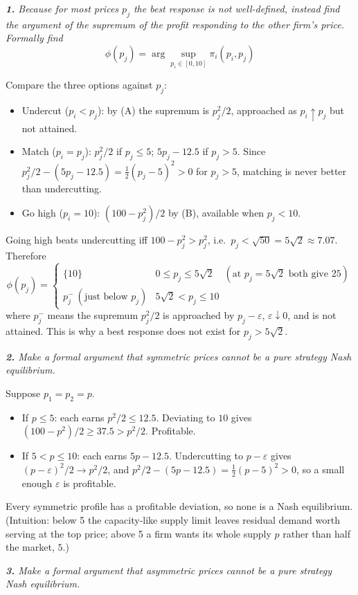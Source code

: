 \documentclass[11pt]{article}
\newcommand{\question}[1]{\par\smallskip\noindent\colorbox{black!6}{\parbox{\dimexpr\linewidth-2\fboxsep}{\itshape #1}}\par\smallskip}
\begin{document}
\question{\textbf{1.} Because for most prices $p_j$ the best response is not well-defined, instead find the argument of the supremum of the profit responding to the other firm's price. Formally find
\[
\phi(p_j)=\arg\sup_{p_i\in[0,10]}\pi_i(p_i,p_j)
\]}

Compare the three options against $p_j$:
\begin{itemize}
\item Undercut ($p_i<p_j$): by (A) the supremum is $p_j^2/2$, approached as $p_i\uparrow p_j$ but not attained.
\item Match ($p_i=p_j$): $p_j^2/2$ if $p_j\le5$; $5p_j-12.5$ if $p_j>5$. Since $p_j^2/2-(5p_j-12.5)=\tfrac12(p_j-5)^2>0$ for $p_j>5$, matching is never better than undercutting.
\item Go high ($p_i=10$): $(100-p_j^2)/2$ by (B), available when $p_j<10$.
\end{itemize}
Going high beats undercutting iff $100-p_j^2>p_j^2$, i.e.\ $p_j<\sqrt{50}=5\sqrt2\approx7.07$. Therefore
\[
\phi(p_j)=\begin{cases}
\{10\} & 0\le p_j\le5\sqrt2 \quad(\text{at } p_j=5\sqrt2 \text{ both give } 25)\\[2pt]
p_j^- \ (\text{just below } p_j) & 5\sqrt2<p_j\le10
\end{cases}
\]
where $p_j^-$ means the supremum $p_j^2/2$ is approached by $p_j-\varepsilon$, $\varepsilon\downarrow0$, and is not attained. This is why a best response does not exist for $p_j>5\sqrt2$.

\question{\textbf{2.} Make a formal argument that symmetric prices cannot be a pure strategy Nash equilibrium.}

Suppose $p_1=p_2=p$.
\begin{itemize}
\item If $p\le5$: each earns $p^2/2\le12.5$. Deviating to $10$ gives $(100-p^2)/2\ge37.5>p^2/2$. Profitable.
\item If $5<p\le10$: each earns $5p-12.5$. Undercutting to $p-\varepsilon$ gives $(p-\varepsilon)^2/2\to p^2/2$, and $p^2/2-(5p-12.5)=\tfrac12(p-5)^2>0$, so a small enough $\varepsilon$ is profitable.
\end{itemize}
Every symmetric profile has a profitable deviation, so none is a Nash equilibrium. (Intuition: below 5 the capacity-like supply limit leaves residual demand worth serving at the top price; above 5 a firm wants its whole supply $p$ rather than half the market, $5$.)

\question{\textbf{3.} Make a formal argument that asymmetric prices cannot be a pure strategy Nash equilibrium.}
\end{document}
